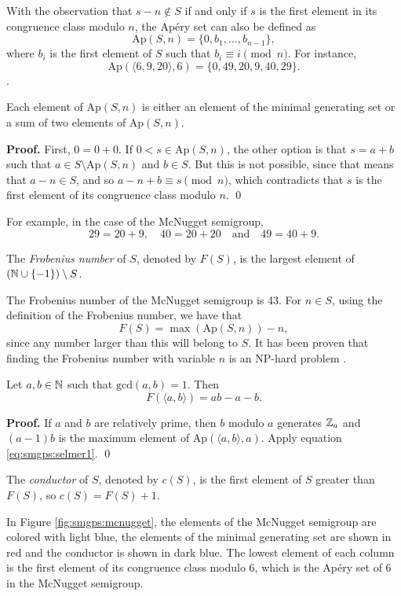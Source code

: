 With the observation that $s - n \notin S$ if and only if $s$ is the first element in its congruence class modulo $n$, the Apéry set can also be defined as  
\[\mathrm{Ap}(S, n) =  \{0, b_1, \ldots, b_{n - 1}\},\]
where $b_i$ is the first element of $S$ such that \(b_i \equiv i \pmod n\). 
For instance, \[\mathrm{Ap}(\langle 6, 9, 20 \rangle, 6) = \{0, 49, 20, 9, 40, 29\}.\]. 
\begin{proposition}
    Each element of $\mathrm{Ap}(S, n)$ is either an element of the minimal generating set or a sum of two elements of $\mathrm{Ap}(S, n)$. 
\end{proposition}
\textbf{Proof. } First, $0 = 0 + 0$. If $0 < s \in \mathrm{Ap}(S, n)$, the other option is that $s = a + b$ such that $a \in S\setminus\mathrm{Ap}(S, n)$ and $b \in S$. But this is not possible, since that means that $a - n \in S$, and so $a - n + b \equiv s \pmod{n}$, which contradicts that $s$ is the first element of its congruence class modulo $n$. \qed \par  
For example, in the case of the McNugget semigroup,
\[29 = 20 + 9, \quad 40 = 20 + 20 \quad \text{and} \quad 49 = 40 + 9.\]
\begin{definition}\label{def:smgps:frobeniusnum}
    The \textit{Frobenius number} of $S$, denoted by $F(S)$, is the largest element of $(\mathbb{N} \cup \{-1\}) \setminus S$.
\end{definition}

The Frobenius number of the McNugget semigroup is 43. For $n \in S$, using the definition of the Frobenius number, we have that
\begin{equation}\label{eq:smgps:selmer1}
    F(S) = \max (\mathrm{Ap}(S, n)) - n,
\end{equation}
since any number larger than this will belong to $S$. It has been proven that finding the Frobenius number with variable $n$ is an NP-hard problem \cite{ramirez1996complexity}.

\begin{theorem} Let $a, b \in \mathbb{N}$ such that $\mathrm{gcd}(a, b) = 1$. Then 
    \[F(\langle a, b \rangle) = ab - a - b.\] 
\end{theorem}
\textbf{Proof. } If $a$ and $b$ are relatively prime, then $b$ modulo $a$ generates $\mathbb{Z}_a$ and $(a - 1)b$ is the maximum element of $\mathrm{Ap}(\langle a, b\rangle, a)$. Apply equation \ref{eq:smgps:selmer1}. \qed

\begin{definition}
    The \textit{conductor} of $S$, denoted by $c(S)$, is the first element of $S$ greater than $F(S)$, so $c(S) = F(S) + 1$.
\end{definition}
In Figure \ref{fig:smgps:mcnugget}, the elements of the McNugget semigroup are colored with light blue, the elements of the minimal generating set are shown in red and the conductor is shown in dark blue. The lowest element of each column is the first element of its congruence class modulo 6, which is the Apéry set of 6 in the McNugget semigroup. \par

